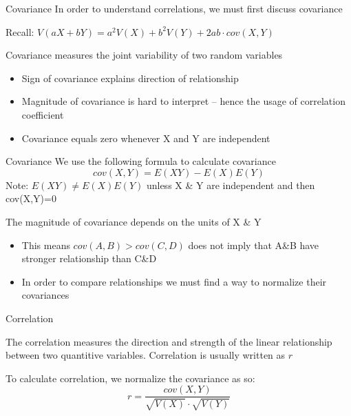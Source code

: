 \documentclass{beamer}
\begin{document}
\begin{frame}{Covariance}
	In order to understand correlations, we must first discuss \alert{covariance}
	
	Recall: $V(aX+bY)=a^2V(X)+b^2V(Y)+2ab\cdot cov(X,Y)$
	
	Covariance measures the joint variability of two random variables
	\small{\begin{itemize}
		\item Sign of covariance explains direction of relationship
		\item Magnitude of covariance is hard to interpret -- hence the usage of \alert{correlation coefficient}
		\item Covariance equals zero whenever X and Y are \alert{independent}
		\end{itemize}}
\end{frame}

\begin{frame}{Covariance}
	We use the following formula to calculate covariance
	$$cov(X,Y)=E(XY)-E(X)E(Y)$$
	Note: $E(XY) \neq E(X)E(Y)$ unless X \& Y are independent and then cov(X,Y)=0
	
	
	The magnitude of covariance depends on the units of X \& Y
	\begin{itemize}
		\item This means $cov(A,B) > cov(C,D)$ \alert{does not} imply that A\&B have stronger relationship than C\&D
		\item In order to compare relationships we must find a way to normalize their covariances 
	\end{itemize}
\end{frame}

\begin{frame}{Correlation}
	\begin{definition}[Correlation]
		The correlation measures the direction and strength of the linear relationship between two quantitive variables. Correlation is usually written as $r$
	\end{definition}
	To calculate correlation, we normalize the covariance as so:
	$$r=\frac{cov(X,Y)}{\sqrt{V(X)}\cdot \sqrt{V(Y)}}$$
\end{frame}
\end{document}

